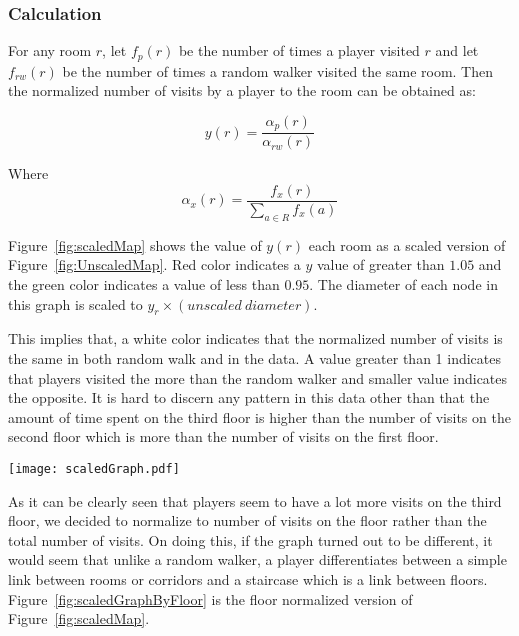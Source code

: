 \subsubsection{Calculation}


For any room $r$, let $f_p(r)$ be the number of times a player visited $r$ and let $f_{rw}(r)$ be the number of times a random walker visited the same room. Then the normalized number of visits by a player to the room can be obtained as:

\begin{equation}
y(r) = \frac{\alpha_p(r)}{\alpha_{rw}(r)}
\end{equation}

Where
\begin{equation}
\alpha_x(r) = \frac{f_x(r)}{\sum_{a \in R} f_x(a)}
\end{equation}

Figure~\ref{fig:scaledMap} shows the value of $y(r)$ each room  as a scaled version of Figure~\ref{fig:UnscaledMap}. Red color indicates a $y$ value of greater than $1.05$ and the green color indicates a value of less than $0.95$. The diameter of each node in this graph is scaled to $y_r \times (unscaled\ diameter)$.



This implies that, a white color indicates that the normalized number of visits is the same in both random walk and in the data. A value greater than 1 indicates that players visited the more than the random walker and smaller value indicates the opposite. It is hard to discern any pattern in this data other than that the amount of time spent on the third floor is higher than the number of visits on the second floor which is more than the number of visits on the first floor.


\begin{figure*}[!htb]
\centering
\texttt{[image: scaledGraph.pdf]}
\caption{Map scaled by normalized number of visits}
\label{fig:scaledMap}
\end{figure*}

As it can be clearly seen that players seem to have a lot more visits on the third floor, we decided to normalize to number of visits on the floor rather than the total number of visits. On doing this, if the graph turned out to be different, it would seem that unlike a random walker, a player differentiates between a simple link between rooms or corridors and a staircase which is a link between floors. Figure~\ref{fig:scaledGraphByFloor} is the floor normalized version of Figure~\ref{fig:scaledMap}.


